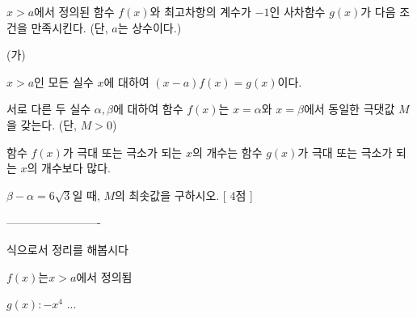 \documentclass{oblivoir}
\begin{document}
   
$x>a$에서 정의된 함수 $f(x)$와 최고차항의 계수가 $-1$인 사차함수 $g(x)$가 다음 조건을 만족시킨다. (단, $a$는 상수이다.)
   \begin{condition}{(가)}
   \item $x>a$인 모든 실수 $x$에 대하여 $(x-a)f(x)=g(x)$이다.
   \item 서로 다른 두 실수 $\alpha, \beta$에 대하여 함수 $f(x)$는  $x=\alpha$와 $x=\beta$에서 동일한 극댓값 $M$을 갖는다. (단, $M>0$)
   \item 함수 $f(x)$가 극대 또는 극소가 되는 $x$의 개수는 함수 $g(x)$가 극대 또는 극소가 되는 $x$의 개수보다 많다.
   \end{condition}
 

$\beta - \alpha = 6\sqrt{3}$일 때, $M$의 최솟값을 구하시오. [ 4점 ]


-------------------------


식으로서 정리를 해봅시다


$f(x)는 x>a $에서 정의됨


$g(x) : -x^4$ ...
\end{document}
